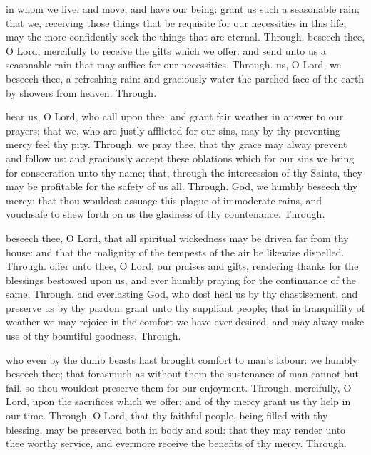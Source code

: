 \begin{multicols}{2}
 in whom we live, and move, and have our being: grant us such a seasonable rain; that we, receiving those things that be requisite for our necessities in this life, may the more confidently seek the things that are eternal. Through.
 beseech thee, O Lord, mercifully to receive the gifts which we offer: and send unto us a seasonable rain that may suffice for our necessities. Through.
 us, O Lord, we beseech thee, a refreshing rain: and graciously water the parched face of the earth by showers from heaven. Through.

 hear us, O Lord, who call upon thee: and grant fair weather in answer to our prayers; that we, who are justly afflicted for our sins, may by thy preventing mercy feel thy pity. Through.
 we pray thee, that thy grace may alway prevent and follow us: and graciously accept these oblations which for our sins we bring for consecration unto thy name; that, through the intercession of thy Saints, they may be profitable for the safety of us all. Through.
 God, we humbly beseech thy mercy: that thou wouldest assuage this plague of immoderate rains, and vouchsafe to shew forth on us the gladness of thy countenance. Through.

 beseech thee, O Lord, that all spiritual wickedness may be driven far from thy house: and that the malignity of the tempests of the air be likewise dispelled. Through.
 offer unto thee, O Lord, our praises and gifts, rendering thanks for the blessings bestowed upon us, and ever humbly praying for the continuance of the same. Through.
 and everlasting God, who dost heal us by thy chastisement, and preserve us by thy pardon: grant unto thy suppliant people; that in tranquillity of weather we may rejoice in the comfort we have ever desired, and may alway make use of thy bountiful goodness. Through.

 who even by the dumb beasts hast brought comfort to man's labour: we humbly beseech thee; that forasmuch as without them the sustenance of man cannot but fail, so thou wouldest preserve them for our enjoyment. Through.
 mercifully, O Lord, upon the sacrifices which we offer: and of thy mercy grant us thy help in our time. Through.
 O Lord, that thy faithful people, being filled with thy blessing, may be preserved both in body and soul: that they may render unto thee worthy service, and evermore receive the benefits of thy mercy. Through.


\end{multicols}
